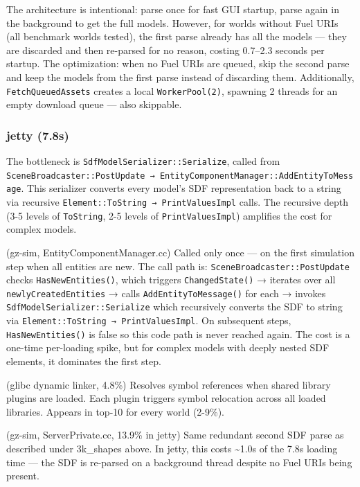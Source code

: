 \documentclass[11pt, a4paper]{article}
\begin{document}
\begin{description}[style=nextline, leftmargin=1.5cm]
The architecture is intentional: parse once for fast GUI startup, parse again in the background to get the full models. However, for worlds without Fuel URIs (all benchmark worlds tested), the first parse already has all the models --- they are discarded and then re-parsed for no reason, costing 0.7--2.3 seconds per startup. The optimization: when no Fuel URIs are queued, skip the second parse and keep the models from the first parse instead of discarding them. Additionally, \texttt{FetchQueuedAssets} creates a local \texttt{WorkerPool(2)}, spawning 2 threads for an empty download queue --- also skippable.
\end{description}

\subsubsection*{jetty (7.8s)}

The bottleneck is
\texttt{SdfModelSerializer::Serialize}, called from
\texttt{SceneBroadcaster::PostUpdate\ →\ EntityComponentManager::AddEntityToMessage}.
This serializer converts every model's SDF representation back to a
string via recursive \texttt{Element::ToString\ →\ PrintValuesImpl}
calls. The recursive depth (3-5 levels of \texttt{ToString}, 2-5 levels
of \texttt{PrintValuesImpl}) amplifies the cost for complex models.

\begin{description}[style=nextline, leftmargin=1.5cm]
\item[\texttt{SdfModelSerializer::Serialize}] (gz-sim, EntityComponentManager.cc) Called only once --- on the first simulation step when all entities are new. The call path is: \texttt{SceneBroadcaster::PostUpdate} checks \texttt{HasNewEntities()}, which triggers \texttt{ChangedState()} → iterates over all \texttt{newlyCreatedEntities} → calls \texttt{AddEntityToMessage()} for each → invokes \texttt{SdfModelSerializer::Serialize} which recursively converts the SDF to string via \texttt{Element::ToString → PrintValuesImpl}. On subsequent steps, \texttt{HasNewEntities()} is false so this code path is never reached again. The cost is a one-time per-loading spike, but for complex models with deeply nested SDF elements, it dominates the first step.
\item[\texttt{do\_lookup\_x}] (glibc dynamic linker, 4.8\%) Resolves symbol references when shared library plugins are loaded. Each plugin triggers symbol relocation across all loaded libraries. Appears in top-10 for every world (2-9\%).
\item[\texttt{DownloadAssets}] (gz-sim, ServerPrivate.cc, 13.9\% in jetty) Same redundant second SDF parse as described under 3k\_shapes above. In jetty, this costs \textasciitilde 1.0s of the 7.8s loading time --- the SDF is re-parsed on a background thread despite no Fuel URIs being present.
\end{description}
\end{document}
